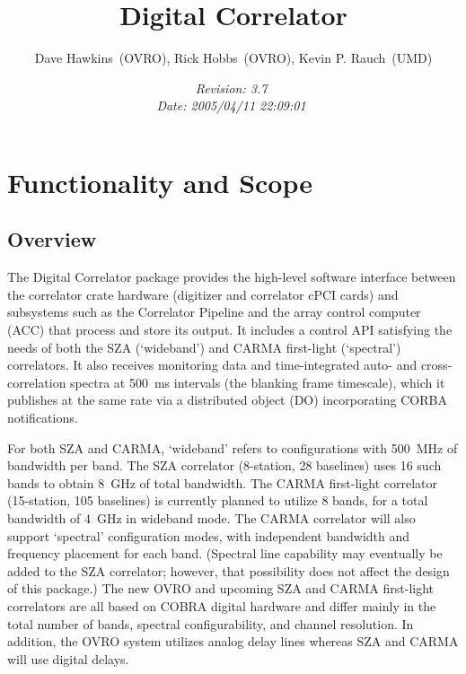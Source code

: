 \documentclass[11pt]{article}
\begin{document}
\title{\LARGE\bf Digital Correlator}
\author{Dave Hawkins~(OVRO), Rick Hobbs~(OVRO), Kevin P. Rauch~(UMD)}
\date {\it $ $Revision: 3.7 $ $ \\ $ $Date: 2005/04/11 22:09:01 $ $}
\maketitle

%
%
\section{Functionality and Scope}
%
%
\subsection{Overview}
%
%
The Digital Correlator package provides the high-level software interface
between the correlator crate hardware (digitizer and correlator cPCI cards)
and subsystems such as the Correlator Pipeline and the array control computer
(ACC) that process and store its output. It includes a control API satisfying
the needs of both the SZA (`wideband') and CARMA first-light (`spectral')
correlators. It also receives monitoring data and time-integrated auto- and
cross-correlation spectra at 500~ms intervals (the blanking frame timescale),
which it publishes at the same rate via a distributed object (DO)
incorporating CORBA notifications. 

For both SZA and CARMA, `wideband' refers to configurations with 500~MHz of
bandwidth per band. The SZA correlator (8-station, 28 baselines) uses 16 such
bands to obtain 8~GHz of total bandwidth. The CARMA first-light correlator
(15-station, 105 baselines) is currently planned to utilize 8 bands, for a
total bandwidth of 4~GHz in wideband mode. The CARMA correlator will also
support `spectral' configuration modes, with independent bandwidth and
frequency placement for each band. (Spectral line capability may eventually be
added to the SZA correlator; however, that possibility does not affect the
design of this package.) The new OVRO and upcoming SZA and CARMA first-light
correlators are all based on COBRA digital hardware and differ mainly in the
total number of bands, spectral configurability, and channel resolution. 
In addition, the OVRO system utilizes analog delay lines whereas SZA and CARMA
will use digital delays.
\end{document}
